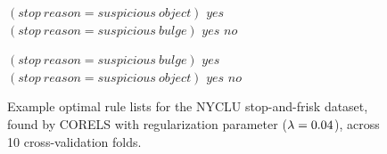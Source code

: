 \begin{figure}[h!]
\begin{algorithmic}
\State \bif $(stop~reason = suspicious~object)$ \bthen $yes$ 
\State \belif $(stop~reason = suspicious~bulge)$ \bthen $yes$
\State \belse $no$
\end{algorithmic}
\vspace{1mm}
\begin{algorithmic}
\State \bif $(stop~reason = suspicious~bulge)$ \bthen $yes$ 
\State \belif $(stop~reason = suspicious~object)$ \bthen $yes$
\State \belse $no$
\end{algorithmic}
\caption{Example optimal rule lists for the NYCLU stop-and-frisk dataset,
found by CORELS with regularization parameter (${\lambda} = 0.04$), across 10 cross-validation folds.
}
\label{fig:weapon-rule-list-04}
\end{figure}


